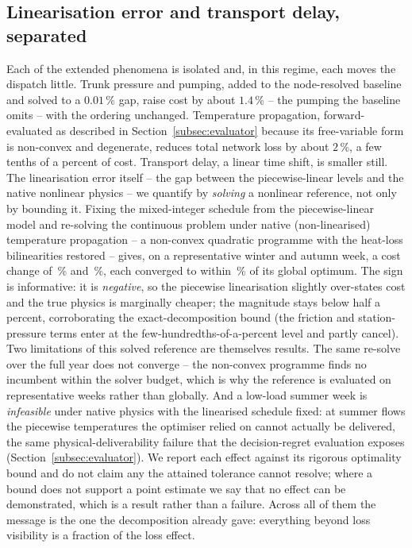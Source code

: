 \documentclass[a4paper,fleqn]{cas-dc}
\begin{document}
\subsection{Linearisation error and transport delay, separated}
\label{subsec:linearisation}
Each of the extended phenomena is isolated and, in this regime, each moves the dispatch little.
Trunk pressure and pumping, added to the node-resolved baseline and solved to a $0.01$\,\%
gap, raise cost by about $1.4$\,\% -- the pumping the baseline omits -- with the ordering
unchanged. Temperature propagation, forward-evaluated as described in Section~\ref{subsec:evaluator}
because its free-variable form is non-convex and degenerate, reduces total network loss by about
$2$\,\%, a few tenths of a percent of cost. Transport delay, a linear time shift, is smaller
still. The linearisation error itself -- the gap between the piecewise-linear levels and the
native nonlinear physics -- we quantify by \emph{solving} a nonlinear reference, not only by
bounding it. Fixing the mixed-integer schedule from the piecewise-linear model and re-solving the
continuous problem under native (non-linearised) temperature propagation -- a non-convex quadratic
programme with the heat-loss bilinearities restored -- gives, on a representative winter and autumn
week, a cost change of \,\% and \,\%,
each converged to within \,\% of its global optimum. The sign is
informative: it is \emph{negative}, so the piecewise linearisation slightly over-states cost and
the true physics is marginally cheaper; the magnitude stays below half a percent, corroborating
the exact-decomposition bound (the friction and station-pressure terms enter at the
few-hundredths-of-a-percent level and partly cancel). Two limitations of this solved reference are
themselves results. The same re-solve over the full year does not converge -- the non-convex
programme finds no incumbent within the solver budget, which is why the reference is evaluated on
representative weeks rather than globally. And a low-load summer week is \emph{infeasible} under
native physics with the linearised schedule fixed: at summer flows the piecewise temperatures the
optimiser relied on cannot actually be delivered, the same physical-deliverability failure that the
decision-regret evaluation exposes (Section~\ref{subsec:evaluator}). We report each effect against
its rigorous optimality bound and do not claim any the attained tolerance cannot resolve; where a
bound does not support a point estimate we say that no effect can be demonstrated, which is a
result rather than a failure. Across all of them the message is the one the decomposition
already gave: everything beyond loss visibility is a fraction of the loss effect.

\end{document}
